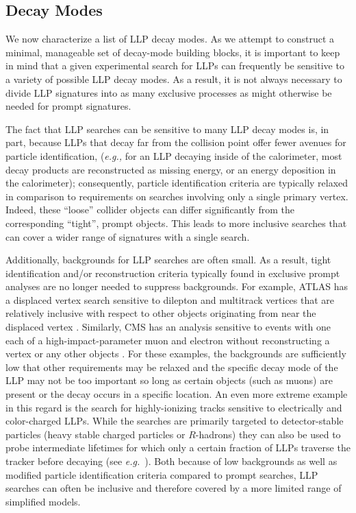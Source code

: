 \subsection{Decay Modes}\label{sec:decmodes}


We now characterize a list of LLP decay modes. As we attempt to construct
a minimal, manageable set of decay-mode building blocks, it is important to keep in mind that a given experimental search for LLPs can frequently be
sensitive to a variety of possible LLP decay modes. As a result, it is not always necessary to divide LLP signatures into as many exclusive processes as might otherwise be needed for prompt signatures.

The fact that LLP searches can be sensitive to many LLP decay modes is, in part,
because LLPs that decay far from the collision point offer fewer
avenues for particle identification, (\emph{e.g.,} for an LLP decaying
inside of the calorimeter, most decay products are reconstructed as missing
energy, or an energy deposition in the calorimeter); consequently, particle identification
criteria are typically relaxed in comparison to requirements on searches involving
only a single primary vertex. Indeed, these ``loose'' collider objects can
differ significantly from the corresponding ``tight'', prompt objects. This leads to more 
inclusive searches that can cover a wider range of signatures with a single search.


 Additionally,  backgrounds for LLP searches
are often small. As a result,  tight identification and/or reconstruction
criteria typically found in exclusive prompt analyses are  no longer needed to suppress
backgrounds. For example, ATLAS has a displaced vertex search
sensitive to dilepton and multitrack vertices that are relatively
inclusive with respect to other objects originating from near the displaced vertex
\cite{Aad:2015rba}. Similarly, CMS has an analysis sensitive to
events with one each of a high-impact-parameter muon and electron without reconstructing a vertex or any other objects
\cite{CMS-PAS-EXO-16-022}. For these examples, the backgrounds are sufficiently low that other requirements may be relaxed and the specific decay mode of the LLP may not be too important so long as certain objects (such as muons) are present or the decay occurs in a specific location. An even more extreme example in this regard is the search for highly-ionizing tracks sensitive to electrically and color-charged LLPs. While the searches are primarily targeted to detector-stable particles (heavy stable charged particles or $R$-hadrons) they can also be used to probe intermediate lifetimes for which only a certain fraction of LLPs traverse the tracker before decaying (see \emph{e.g.}~\cite{Garny:2017rxs}). Both because of low backgrounds as well as modified particle identification criteria compared to prompt searches, LLP searches can often be inclusive and therefore covered by a more limited range of simplified models.

